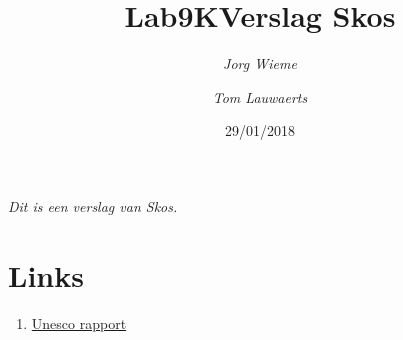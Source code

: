 \documentclass[12pt, letterpaper, oneside]{article}
\title{Lab9K\endgraf\textbf{Verslag Skos}}
\date{29/01/2018}
\author{\textit{Jorg Wieme}
	 	\and
 		\textit{Tom Lauwaerts}}
\begin{document}
\begin{titlepage}
\maketitle
\thispagestyle{empty}
\end{titlepage}

\begin{adjustwidth}{6.0em}{6.0em}
\centering \textit{Dit is een verslag van Skos.}
\end{adjustwidth}
\newpage

\tableofcontents


\newpage
\appendix

\section{Links}
\begin{enumerate}
	\item \href{http://blog.sparna.fr/2017/02/06/unesco-thesaurus-published-with-semantic-web-standards-and-open-source-software/}{Unesco rapport}
\end{enumerate}
\end{document}
